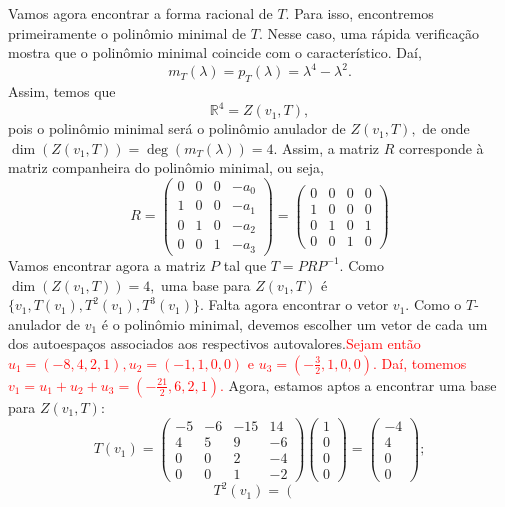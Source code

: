 \documentclass[11pt,a4paper]{article}
\begin{document}
{Vamos agora encontrar a forma racional de $T.$ Para isso, encontremos primeiramente o polinômio minimal de $T.$ Nesse caso, uma rápida verificação mostra que o polinômio minimal coincide com o característico. Daí,
\[
m_T(\lambda) = p_T(\lambda) = \lambda^4 - \lambda^2.
\]
Assim, temos que
\[
\mathbb{R}^4 = Z(v_1, T),
\]
pois o polinômio minimal será o polinômio anulador de $Z(v_1,T),$ de onde $\dim(Z(v_1, T)) = \deg(m_T(\lambda)) = 4.$ Assim, a matriz $R$ corresponde à matriz companheira do polinômio minimal, ou seja,
\[R = \begin{pmatrix}
0 & 0 & 0 & -a_0 \\
1 & 0 & 0 & -a_1 \\
0 & 1 & 0 & -a_2 \\
0 & 0 & 1 &  -a_3
\end{pmatrix} = \begin{pmatrix}
0 & 0 & 0 & 0 \\
1 & 0 & 0 & 0 \\
0 & 1 & 0 & 1 \\
0 & 0 & 1 & 0
\end{pmatrix}
\]
Vamos encontrar agora a matriz $P$ tal que $T = PRP^{-1}.$ Como $\dim(Z(v_1, T)) = 4,$ uma base para $Z(v_1, T)$ é $\{ v_1, T(v_1), T^2(v_1), T^3(v_1) \}.$ Falta agora encontrar o vetor $v_1.$ Como o $T$-anulador de $v_1$ é o polinômio minimal, devemos escolher um vetor de cada um dos autoespaços associados aos respectivos autovalores.\textcolor{Red}{Sejam então $u_1 = (-8,4,2,1), u_2 = (-1,1,0,0)$ e $u_3 = \left( - \frac{3}{2}, 1, 0, 0 \right).$ Daí, tomemos $v_1 = u_1 + u_2 + u_3 = \left(-\frac{21}{2}, 6, 2, 1 \right).$ } Agora, estamos aptos a encontrar uma base para $Z(v_1, T):$
\[
T(v_1) = \begin{pmatrix}
-5 & -6 & -15 & 14 \\
4 & 5 & 9 & -6 \\
0 & 0 & 2 & -4 \\
0 & 0 & 1 & -2
\end{pmatrix} \begin{pmatrix}
1 \\
0 \\
0 \\
0
\end{pmatrix} = \begin{pmatrix}
-4 \\
4 \\
0 \\
0
\end{pmatrix};
\]
\[
T^2(v_1) = \left(\begin{matrix}

\end{matrix}\]}
\end{document}
